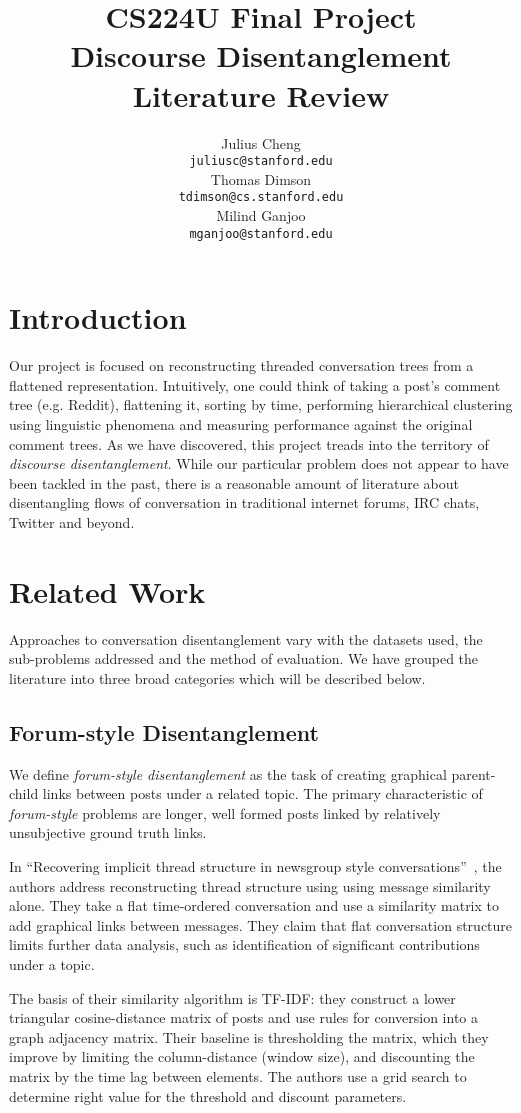 \documentclass[11pt]{article}
\title{{\small CS224U Final Project} \\ Discourse Disentanglement \\Literature Review}
\author{Julius Cheng \\
  {\tt juliusc@stanford.edu}
  \\\And
  Thomas Dimson  \\
  {\tt tdimson@cs.stanford.edu}
  \\\AND
  Milind Ganjoo \\
  {\tt mganjoo@stanford.edu}
}
\date{}
\newcommand{\titlecite}[2]{``#1''~\cite{#2}}
\begin{document}
\maketitle

\section{Introduction}
Our project is focused on reconstructing threaded conversation trees
from a flattened representation. Intuitively, one could think of 
taking a post's comment tree (e.g. Reddit), flattening it, sorting by time, performing
hierarchical clustering using linguistic phenomena and measuring performance 
against the original comment trees. As we have
discovered, this project treads into the territory of \textit{discourse disentanglement}.
While our particular problem does not appear to have been tackled in the past,
there is a reasonable amount of literature about disentangling flows of conversation
in traditional internet forums, IRC chats, Twitter and beyond.

\section{Related Work}
Approaches to conversation disentanglement vary with the datasets used, the 
sub-problems addressed and the method of evaluation. We have grouped the literature into
three broad categories which will be described below.

\subsection{Forum-style Disentanglement}
\label{sec:threaded}
We define \textit{forum-style disentanglement} as the task of creating 
graphical parent-child links between posts under a related topic. The primary characteristic 
of \textit{forum-style} problems are longer, well formed posts 
linked by relatively unsubjective ground truth links.

In \titlecite{Recovering implicit thread structure in newsgroup style conversations}{Wang2008a}, 
the authors address reconstructing thread structure using using 
message similarity alone. They take a flat
time-ordered conversation and use a similarity matrix to add graphical
links between messages. They claim that flat conversation structure
limits further data analysis, such as identification of significant
contributions under a topic. 

The basis of their similarity algorithm is TF-IDF: they
construct a lower triangular cosine-distance matrix of posts and use rules 
for conversion into a graph adjacency matrix. Their baseline is thresholding the
matrix, which they improve by limiting the column-distance (window size), and discounting
the matrix by the time lag between elements. The authors use a grid search to
determine right value for the threshold and discount parameters.
\end{document}
